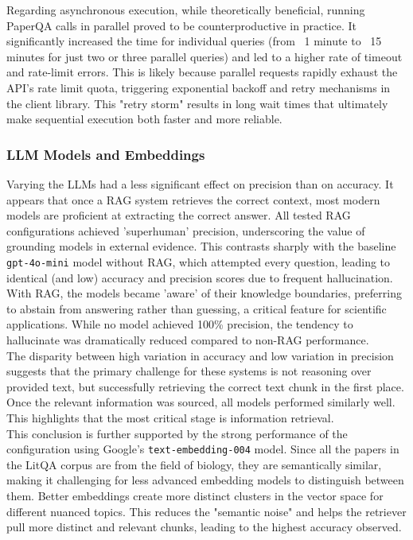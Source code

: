 Regarding asynchronous execution, while theoretically beneficial, running PaperQA calls in parallel proved to be counterproductive in practice. It significantly increased the time for individual queries (from ~1 minute to ~15 minutes for just two or three parallel queries) and led to a higher rate of timeout and rate-limit errors. This is likely because parallel requests rapidly exhaust the API's rate limit quota, triggering exponential backoff and retry mechanisms in the client library. This "retry storm" results in long wait times that ultimately make sequential execution both faster and more reliable. \\

\subsubsection{LLM Models and Embeddings}
Varying the LLMs had a less significant effect on precision than on accuracy. It appears that once a RAG system retrieves the correct context, most modern models are proficient at extracting the correct answer. All tested RAG configurations achieved 'superhuman' precision, underscoring the value of grounding models in external evidence. This contrasts sharply with the baseline \texttt{gpt-4o-mini} model without RAG, which attempted every question, leading to identical (and low) accuracy and precision scores due to frequent hallucination. With RAG, the models became 'aware' of their knowledge boundaries, preferring to abstain from answering rather than guessing, a critical feature for scientific applications. While no model achieved 100\% precision, the tendency to hallucinate was dramatically reduced compared to non-RAG performance. \\

The disparity between high variation in accuracy and low variation in precision suggests that the primary challenge for these systems is not reasoning over provided text, but successfully retrieving the correct text chunk in the first place. Once the relevant information was sourced, all models performed similarly well. This highlights that the most critical stage is information retrieval. \\

This conclusion is further supported by the strong performance of the configuration using Google's \texttt{text-embedding-004} model. Since all the papers in the LitQA corpus are from the field of biology, they are semantically similar, making it challenging for less advanced embedding models to distinguish between them. Better embeddings create more distinct clusters in the vector space for different nuanced topics. This reduces the "semantic noise" and helps the retriever pull more distinct and relevant chunks, leading to the highest accuracy observed. \\

